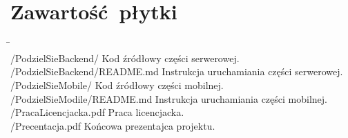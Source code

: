 \documentclass[licencjacka]{pracamgr}
\begin{document}
\chapter{Zawartość płytki}\label{r:build}
\begin{tabbing}
      \hspace{20em} \=   \hspace{10em} \\
    /PodzielSieBackend/ \> Kod źródłowy części serwerowej. \\
    /PodzielSieBackend/README.md \> Instrukcja uruchamiania części serwerowej. \\
    /PodzielSieMobile/ \> Kod źródłowy części mobilnej. \\
    /PodzielSieModile/README.md \> Instrukcja uruchamiania części mobilnej. \\
    /PracaLicencjacka.pdf \> Praca licencjacka. \\
    /Precentacja.pdf \> Końcowa prezentajca projektu. \\
\end{tabbing}
\end{document}
